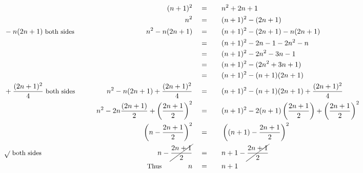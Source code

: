 \begin{alignat*}{5}
&\,&(n+1)^2\quad&=\quad&&n^2+2n+1\\
&\,&n^2\quad&=&&(n+1)^2-(2n+1)\\
&\small-n(2n+1)\text{ both sides}&n^2-n(2n+1)\quad&=&&(n+1)^2-(2n+1)-n(2n+1)\\
&\,&\,&=&&(n+1)^2-2n-1-2n^2-n\\
&\,&\,&=&&(n+1)^2-2n^2-3n-1\\
&\,&\,&=&&(n+1)^2-(2n^2+3n+1)\\
&\,&\,&=&&(n+1)^2-(n+1)(2n+1)\\
&\small+\frac{(2n+1)^2}{4}\text{ both sides}\normalsize\qquad&n^2-n(2n+1)+\frac{(2n+1)^2}{4}\quad&=&&(n+1)^2-(n+1)(2n+1)+\frac{(2n+1)^2}{4}\\
&\,&n^2-2n\frac{(2n+1)}{2}+\left(\frac{2n+1}{2}\right)^2\quad&=&&(n+1)^2-2(n+1)\left(\frac{2n+1}{2}\right)+\left(\frac{2n+1}{2}\right)^2\\
&\,&\left(n-\frac{2n+1}{2}\right)^2\quad&=&&\left((n+1)-\frac{2n+1}{2}\right)^2\\
&\small\sqrt{}\text{ both sides}&n-\cancel{\frac{2n+1}{2}}\quad&=&&n+1-\cancel{\frac{2n+1}{2}}\\
&\,&\small\text{Thus}\qquad\qquad\normalsize n\quad&=&&n+1
\end{alignat*}
